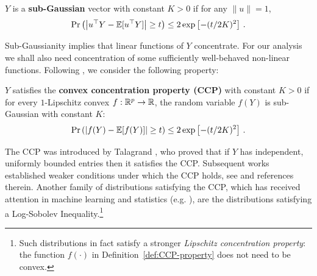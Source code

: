 \documentclass[times,sort&compress,3p]{elsarticle}
\begin{document}
\begin{definition}
    \label{def:sub-gaussian-linear}
            $Y$ is a {\bf sub-Gaussian} vector with constant $K>0$ if for any 
            $\|u\|=1$,
            \[
            \Pr\left( \left|u^\top Y -{\mathbb{E}}[u^\top Y]\right| \ge t \right) \le 2\exp \left[ -(t/2K)^2\right]  \,.                  
            \] 
    \end{definition}
Sub-Gaussianity implies that linear functions of $Y$ concentrate.
For our analysis we shall also need concentration of some sufficiently well-behaved non-linear functions.
Following
\cite{adamczak2011sharp,meckes2012concentration}, we consider the following property:
\begin{definition}
    \label{def:CCP-property}
        $Y$ satisfies the  {\bf convex concentration property  (CCP)} with constant  $K>0$ if for every $1$-Lipschitz {convex} $f:\mathbb{R}^p\to\mathbb{R}$, the random variable $f(Y)$ is sub-Gaussian with constant $K$:
        \begin{equation}\label{eq:ccp}
            \Pr\left( \left|f(Y) -{\mathbb{E}}[f(Y)]\right| \ge t \right) \le 2\exp\left[ -(t/2K)^2\right] \,.
        \end{equation}
    \end{definition}
The CCP was introduced by  
 Talagrand \cite{talagrand1995concentration}, who proved that if $Y$ has independent, uniformly bounded entries then it satisfies the CCP. Subsequent works established weaker conditions under which the CCP holds, see  \cite{adamczak2015note,van2014probability} and references therein.
Another family of distributions satisfying the CCP, which has received attention in machine learning and statistics (e.g. \cite{block2020generative,bakry2013analysis,raginsky2017non}), are the distributions satisfying a Log-Sobolev Inequality.\footnote{Such distributions in fact satisfy a stronger {\it Lipschitz concentration property}: the function $f(\cdot)$ in Definition~\ref{def:CCP-property} does not need to be convex.}
\end{document}
